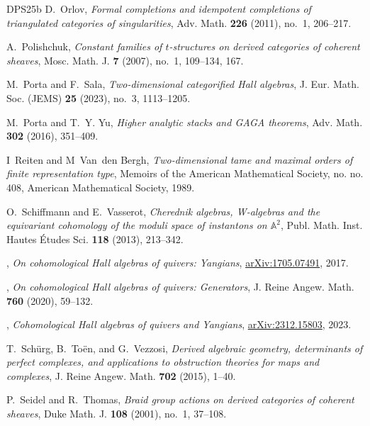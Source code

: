 \documentclass[reqno,a4paper]{amsart}
\theoremstyle{basic-theorem}
\numberwithin{equation}{section}
\begin{document}
\begin{thebibliography}{DPS{\etalchar{+}}25b}
	D.~Orlov, \textit{Formal completions and idempotent completions of triangulated
		categories of singularities}, Adv. Math. \textbf{226} (2011), no.~1,
	206--217.
	
	A.~Polishchuk, \textit{Constant families of {$t$}-structures on derived
		categories of coherent sheaves}, Mosc. Math. J. \textbf{7} (2007), no.~1,
	109--134, 167.
	
	M.~Porta and F.~Sala, \textit{Two-dimensional categorified {H}all algebras}, J.
	Eur. Math. Soc. (JEMS) \textbf{25} (2023), no.~3, 1113--1205.
	
	M.~Porta and T.~Y. Yu, \textit{Higher analytic stacks and {GAGA} theorems}, Adv.
	Math. \textbf{302} (2016), 351--409.
	
	I~Reiten and M~Van~den Bergh, \textit{Two-dimensional tame and maximal orders of
		finite representation type}, Memoirs of the {{American Mathematical}}
	Society, no. no. 408, American Mathematical Society, 1989.
	
	O.~Schiffmann and E.~Vasserot, \textit{Cherednik algebras, {W}-algebras and the
		equivariant cohomology of the moduli space of instantons on
		{$\mathbb{A}^2$}}, Publ. Math. Inst. Hautes \'{E}tudes Sci. \textbf{118}
	(2013), 213--342.
	
	\bysame, \textit{On cohomological {H}all algebras of quivers: {Y}angians},
	\href{https://arxiv.org/abs/1705.07491}{\sf arXiv:1705.07491}, 2017.
	
	\bysame, \textit{On cohomological {H}all algebras of quivers: {G}enerators}, J.
	Reine Angew. Math. \textbf{760} (2020), 59--132.
	
	\bysame, \textit{Cohomological {H}all algebras of quivers and {Y}angians},
	\href{https://arxiv.org/abs/2312.15803}{\sf arXiv:2312.15803}, 2023.	
	
	T.~Sch\"{u}rg, B.~To\"{e}n, and G.~Vezzosi, \textit{Derived algebraic geometry,
	determinants of perfect complexes, and applications to obstruction theories
	for maps and complexes}, J. Reine Angew. Math. \textbf{702} (2015), 1--40.
	
	P.~Seidel and R.~Thomas, \textit{Braid group actions on derived categories of
	coherent sheaves}, Duke Math. J. \textbf{108} (2001), no.~1, 37--108.
	

\end{thebibliography}
\end{document}
